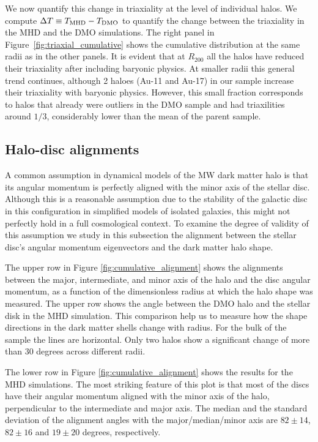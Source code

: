 \documentclass[usenatbib]{mnras}
\begin{document}
We now quantify this change in triaxiality at the level of individual halos.
We compute $\Delta T\equiv T_{\rm MHD}-T_{\rm DMO}$ to quantify the
change between the triaxiality in the MHD and the DMO simulations.
The right panel in Figure~\ref{fig:triaxial_cumulative} shows
the cumulative distribution at the same radii as in the other panels.
It is evident that at $R_{200}$ all the halos have
reduced their triaxiality after including baryonic physics.
At smaller radii this general trend continues, although 2 haloes
(Au-11 and Au-17)  in our sample increase their triaxiality with baryonic physics. 
However, this small fraction corresponds to halos that already were
outliers in the DMO sample and had triaxilities around $1/3$,
considerably lower than the mean of the parent sample.


\subsection{Halo-disc alignments}

A common assumption in dynamical models of the MW dark matter halo is that
its angular momentum is perfectly aligned with the minor axis of the stellar disc.
Although this is a reasonable assumption due to the stability of
the galactic disc in this configuration in simplified models of isolated galaxies, this
might not perfectly hold in a full cosmological context. 
To examine the degree of validity of this assumption we study in this
subsection the alignment between the stellar disc's angular momentum
eigenvectors and the dark matter halo shape.


The upper row in Figure \ref{fig:cumulative_alignment} shows 
the alignments between the major, intermediate, and minor axis of the
halo and the disc angular momentum, as a function of the dimensionless radius at which the halo shape was measured. The upper row shows the angle between the DMO halo and the stellar
disk in the MHD simulation.
This comparison help us to measure how the shape directions in the
dark matter shells change with radius.
For the bulk of the sample the lines are horizontal.
Only two halos show a significant change of more than 30 degrees across different radii.

The lower row in Figure \ref{fig:cumulative_alignment} shows the
results for the MHD simulations.
The most striking feature of this plot is that most of the discs have their angular momentum aligned with the minor axis of the halo, perpendicular to the intermediate and major axis.
The median and the standard deviation of the alignment angles with
the major/median/minor axis are $82\pm14$, $82\pm16$ and $19\pm20$
degrees, respectively.
\end{document}
